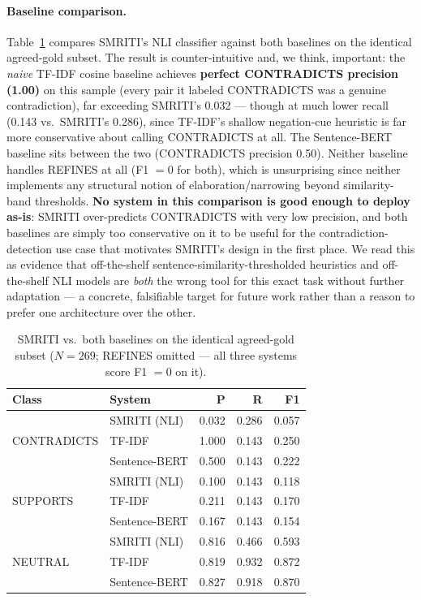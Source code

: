 \paragraph{Baseline comparison.} Table~\ref{tab:baseline-comparison} compares
SMRITI's NLI classifier against both baselines on the identical agreed-gold
subset. The result is counter-intuitive and, we think, important: the
\emph{naive} TF-IDF cosine baseline achieves \textbf{perfect CONTRADICTS
precision (1.00)} on this sample (every pair it labeled CONTRADICTS was a
genuine contradiction), far exceeding SMRITI's 0.032 --- though at much lower
recall (0.143 vs.\ SMRITI's 0.286), since TF-IDF's shallow negation-cue
heuristic is far more conservative about calling CONTRADICTS at all. The
Sentence-BERT baseline sits between the two (CONTRADICTS precision 0.50).
Neither baseline handles REFINES at all (F1 $=0$ for both), which is
unsurprising since neither implements any structural notion of
elaboration/narrowing beyond similarity-band thresholds. \textbf{No system
in this comparison is good enough to deploy as-is}: SMRITI over-predicts
CONTRADICTS with very low precision, and both baselines are simply too
conservative on it to be useful for the contradiction-detection use case
that motivates SMRITI's design in the first place. We read this as evidence
that off-the-shelf sentence-similarity-thresholded heuristics and
off-the-shelf NLI models are \emph{both} the wrong tool for this exact task
without further adaptation --- a concrete, falsifiable target for future work
rather than a reason to prefer one architecture over the other.

\begin{table}[t]
\centering
\small
\begin{tabular}{llrrr}
\toprule
\textbf{Class} & \textbf{System} & \textbf{P} & \textbf{R} & \textbf{F1} \\
\midrule
\multirow{3}{*}{CONTRADICTS}
  & SMRITI (NLI)  & 0.032 & 0.286 & 0.057 \\
  & TF-IDF        & 1.000 & 0.143 & 0.250 \\
  & Sentence-BERT & 0.500 & 0.143 & 0.222 \\
\midrule
\multirow{3}{*}{SUPPORTS}
  & SMRITI (NLI)  & 0.100 & 0.143 & 0.118 \\
  & TF-IDF        & 0.211 & 0.143 & 0.170 \\
  & Sentence-BERT & 0.167 & 0.143 & 0.154 \\
\midrule
\multirow{3}{*}{NEUTRAL}
  & SMRITI (NLI)  & 0.816 & 0.466 & 0.593 \\
  & TF-IDF        & 0.819 & 0.932 & 0.872 \\
  & Sentence-BERT & 0.827 & 0.918 & 0.870 \\
\bottomrule
\end{tabular}
\caption{SMRITI vs.\ both baselines on the identical agreed-gold subset
($N=269$; REFINES omitted --- all three systems score F1 $=0$ on it).}
\label{tab:baseline-comparison}
\end{table}
